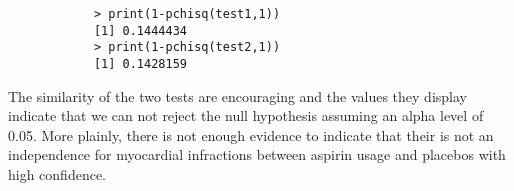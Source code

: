 \documentclass[11pt]{article}
\begin{document}
\begin{enumerate}
\begin{enumerate}
		\begin{verbatim}
			> print(1-pchisq(test1,1))
			[1] 0.1444434
			> print(1-pchisq(test2,1))
			[1] 0.1428159
		\end{verbatim}
		The similarity of the two tests are encouraging and the values they display indicate that we can not reject the null hypothesis assuming an alpha level of 0.05. More plainly, there is not enough evidence to indicate that their is not an independence for myocardial infractions between aspirin usage and placebos with high confidence.
\end{enumerate}
\end{enumerate}
\end{document}
